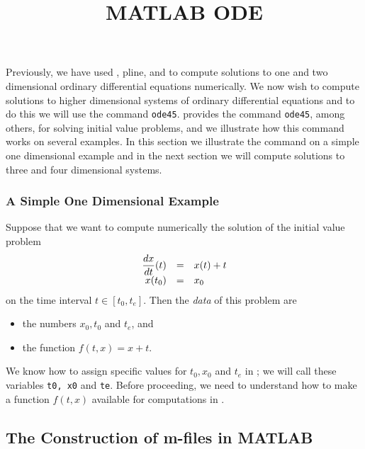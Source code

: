 \documentclass{ximera}
\title{MATLAB ODE}
\begin{document}
\begin{abstract}
\end{abstract}
\maketitle

\label{S:ode45}

Previously, we have used {\dfield}, {\sf pline}, and {\pplane}
to compute solutions to one and two dimensional ordinary differential
equations numerically.  We now wish to compute solutions to higher dimensional
systems of ordinary differential equations and to do this we will use the 
\Matlab command {\tt ode45}.  \Matlab provides the 
command {\tt ode45}, among others, for solving initial value problems, and we 
illustrate how this command works on several examples.  In this section we 
illustrate the command on a simple one dimensional example and in the next
section we will compute solutions to three and four dimensional systems.

\subsubsection*{A Simple One Dimensional Example}

Suppose that we want to compute numerically the solution of the initial value 
problem
\arraystart
\begin{equation}   \label{eq:fexam}
\begin{array}{rcl}
\displaystyle \frac{dx}{dt}(t) & = & x(t)+t \\
x(t_0) & = & x_0
\end{array}
\end{equation}
\arrayfinish
on the time interval $t\in [t_0,t_e]$.  Then the {\em data\/} of this 
problem are 
\begin{itemize}
\item the numbers $x_0,t_0$ and $t_e$, and 
\item the function $f(t,x)=x+t$.  
\end{itemize}
We know how to assign specific values for $t_0,x_0$ and $t_e$ in \Matlabp;
we will call these variables {\tt t0, x0} and {\tt te}.  Before proceeding, 
we need to understand how to make a function $f(t,x)$ available for 
computations in \Matlabp.

\subsection*{The Construction of m-files in MATLAB}
\end{document}
